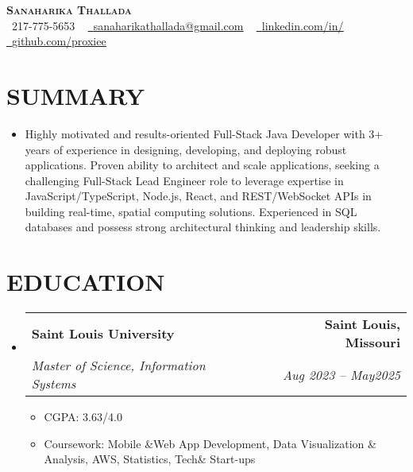 \documentclass[letterpaper,11pt]{article}
\makeatletter
\newcommand{\resumeItem}[1]{\item\small{{#1 \vspace{-3pt}}}}
\newcommand{\resumeSubheading}[4]{\vspace{-2pt}\item\begin{tabular*}{0.97\textwidth}[t]{l@{\extracolsep{\fill}}r}\textbf{#1} & #2 \\ \textit{\small#3} & \textit{\small #4} \\ \end{tabular*}\vspace{-7pt}}
\newcommand{\resumeSubHeadingListStart}{\begin{itemize}[leftmargin=0.15in, label={}]}
\newcommand{\resumeSubHeadingListEnd}{\end{itemize}}
\newcommand{\resumeItemListStart}{\begin{itemize}}
\newcommand{\resumeItemListEnd}{\end{itemize}\vspace{-5pt}}
\makeatother
\begin{document}
\begin{center}
    \textbf{\Huge \scshape {\fontsize{15pt}{20pt}\selectfont Sanaharika Thallada}} \\ \vspace{1pt}
    \small \raisebox{-0.1\height}\faPhone\ 217-775-5653 ~ \href{mailto:sanaharikathallada@gmail.com}{\raisebox{-0.2\height}\faEnvelope\  \underline{sanaharikathallada@gmail.com}} ~ 
    \href{https://www.linkedin.com/in/yashwanthtirupati/}{\raisebox{-0.2\height}\faLinkedin\ \underline{linkedin.com/in/}} ~ 
    \href{https://github.com/proxiee}{\raisebox{-0.2\height}\faGithub\ \underline{github.com/proxiee}}
    \vspace{-8pt}
\end{center}

\section{{\fontsize{9pt}{20pt}\selectfont \textbf{SUMMARY}}}\resumeSubHeadingListStart
\resumeItem{Highly motivated and results-oriented Full-Stack Java Developer with 3+ years of experience in designing, developing, and deploying robust applications. Proven ability to architect and scale applications, seeking a challenging Full-Stack Lead Engineer role to leverage expertise in JavaScript/TypeScript, Node.js, React, and REST/WebSocket APIs in building real-time, spatial computing solutions.  Experienced in SQL databases and possess strong architectural thinking and leadership skills.}
\resumeSubHeadingListEnd\vspace{-18pt}
\section{{\fontsize{9pt}{20pt}\selectfont \textbf{EDUCATION}}}\resumeSubHeadingListStart
\resumeSubheading{Saint Louis University}{\textbf{Saint Louis, Missouri}}{Master of Science, Information Systems}{Aug 2023 – May2025}
\resumeItemListStart
\resumeItem{CGPA: 3.63/4.0}
\resumeItem{Coursework: Mobile \&Web App Development, Data Visualization \& Analysis, AWS, Statistics, Tech\& Start-ups}
\resumeItemListEnd
\resumeSubHeadingListEnd\vspace{-18pt}
\end{document}
